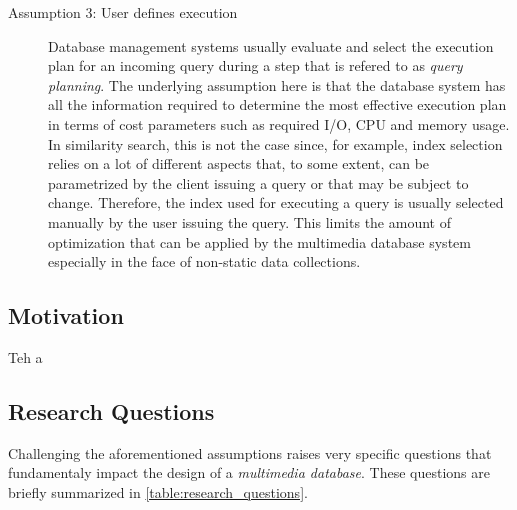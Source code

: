 \begin{description}
    \item[Assumption 3: User defines execution] Database management systems usually evaluate and select the execution plan for an incoming query during a step that is refered to as \emph{query planning}. The underlying assumption here is that the database system has all the information required to determine the most effective execution plan in terms of cost parameters such as required I/O, CPU and memory usage. In similarity search, this is not the case since, for example, index selection relies on a lot of different aspects that, to some extent, can be parametrized by the client issuing a query or that may be subject to change. Therefore, the index used for executing a query is usually selected manually by the user issuing the query. This limits the amount of optimization that can be applied by the multimedia database system especially in the face of non-static data collections.
\end{description}



\subsection{Motivation}

Teh a


\subsection{Research Questions}

Challenging the aforementioned assumptions raises very specific questions that fundamentaly impact the design of a \emph{multimedia database}. These questions are briefly summarized in \cref{table:research_questions}.

